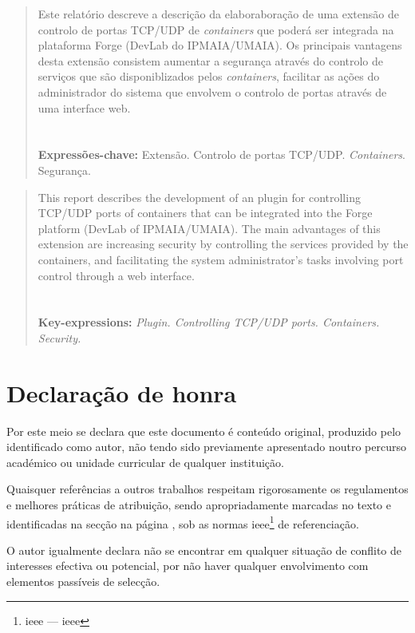 \begin{abstract}
\label{resumo}

Este relatório descreve a descrição da elaboraboração de uma extensão de controlo
de portas TCP/UDP de \textit{containers} que poderá ser integrada na plataforma 
Forge (DevLab do IPMAIA/UMAIA).
Os principais vantagens desta extensão consistem aumentar a segurança através do 
controlo de serviços que são 
disponiblizados pelos \textit{containers}, facilitar as ações do administrador do 
sistema que envolvem o controlo de portas através de uma interface web.
\\
\\
\\
\textbf{Expressões-chave:} Extensão. Controlo de portas TCP/UDP. \textit{Containers}. Segurança.

\end{abstract}


\begin{abstract}
\label{abstract}
This report describes the development of an plugin for controlling TCP/UDP 
ports of containers that can be integrated into the Forge platform (DevLab of 
IPMAIA/UMAIA). The main advantages of this extension are increasing security by 
controlling the services provided by the containers, and facilitating the system 
administrator's tasks involving port control through a web interface.
 \\
 \\
 \\
 \textbf{Key-expressions:} \textit{Plugin. Controlling TCP/UDP ports. Containers. Security.}
 
 
\end{abstract}


\chapter*{Declaração de honra}
\label{way_of_the_samurai}
Por este meio se declara que este documento é conteúdo original, produzido pelo identificado como autor, não tendo sido previamente apresentado noutro percurso académico ou unidade curricular de qualquer instituição.

Quaisquer referências a outros trabalhos respeitam rigorosamente os regulamentos e melhores práticas de
atribuição, sendo apropriadamente marcadas no texto e identificadas na secção \emph{} na página \pageref{chapter:refs}, sob as normas \acrshort{ieee}\footnote{\acrshort{ieee} --- \acrlong{ieee}} de referenciação.

O autor igualmente declara não se encontrar em qualquer situação de conflito de interesses efectiva ou potencial, por não haver qualquer envolvimento com elementos passíveis de selecção.


